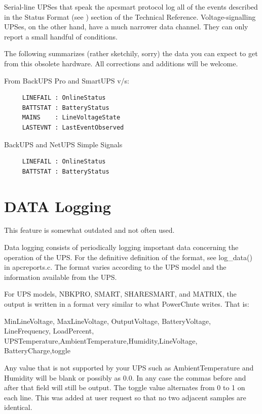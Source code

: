 {{{{{{{{{Serial-line UPSes that speak the apcsmart protocol log all of the events
described in the Status Format (see 
) section of
the Technical Reference.  Voltage-signalling UPSes, on the other hand, have a
much narrower data channel.  They can only report a small handful of
conditions.  

The following summarizes (rather sketchily, sorry) the data you can expect to
get from this obsolete hardware.  All corrections and additions will be
welcome.  

From BackUPS Pro and SmartUPS v/s: 

\footnotesize
\begin{verbatim}
     LINEFAIL : OnlineStatus
     BATTSTAT : BatteryStatus
     MAINS    : LineVoltageState
     LASTEVNT : LastEventObserved
\end{verbatim}
\normalsize

BackUPS and NetUPS Simple Signals 

\footnotesize
\begin{verbatim}
     LINEFAIL : OnlineStatus
     BATTSTAT : BatteryStatus
\end{verbatim}
\normalsize

\label{DATA-Logging}

\section*{DATA Logging}

\label{index-Logging_002c-DATA-233}
\label{index-DATA-Logging-234}
This feature is somewhat outdated and not often used.  

Data logging consists of periodically logging important data concerning the
operation of the UPS. For the definitive definition of the format, see
log\_data() in apcreports.c. The format varies according to the UPS model and
the information available from the UPS.  

For UPS models, NBKPRO, SMART, SHARESMART, and MATRIX, the output is written
in a format very similar to what PowerChute writes. That is:  

MinLineVoltage, MaxLineVoltage, OutputVoltage, BatteryVoltage, LineFrequency,
LoadPercent, UPSTemperature,AmbientTemperature,Humidity,LineVoltage,
BatteryCharge,toggle  

Any value that is not supported by your UPS such as AmbientTemperature and
Humidity will be blank or possibly as 0.0. In any case the commas before and
after that field will still be output. The toggle value alternates from 0 to 1
on each line. This was added at user request so that no two adjacent samples
are identical.  

}}}}}}}}}
